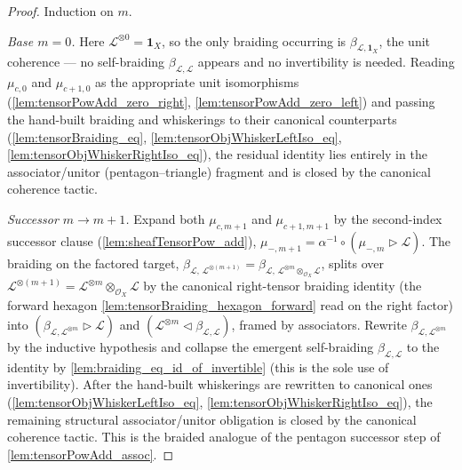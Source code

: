 \begin{proof}
    \leanok
  Induction on \(m\).

  \emph{Base \(m = 0\).} Here \(\mathcal{L}^{\otimes 0} = \mathbf{1}_X\), so the
  only braiding occurring is \(\beta_{\mathcal{L},\mathbf{1}_X}\), the unit
  coherence --- no self-braiding \(\beta_{\mathcal{L},\mathcal{L}}\) appears and
  no invertibility is needed. Reading \(\mu_{c,0}\) and \(\mu_{c+1,0}\) as the
  appropriate unit isomorphisms (\cref{lem:tensorPowAdd_zero_right},
  \cref{lem:tensorPowAdd_zero_left}) and passing the hand-built braiding and
  whiskerings to their canonical counterparts (\cref{lem:tensorBraiding_eq},
  \cref{lem:tensorObjWhiskerLeftIso_eq}, \cref{lem:tensorObjWhiskerRightIso_eq}),
  the residual identity lies entirely in the associator/unitor
  (pentagon--triangle) fragment and is closed by the canonical coherence tactic.

  \emph{Successor \(m \to m+1\).} Expand both \(\mu_{c,m+1}\) and
  \(\mu_{c+1,m+1}\) by the second-index successor clause
  (\cref{lem:sheafTensorPow_add}), \(\mu_{-,m+1} = \alpha^{-1}\circ(\mu_{-,m}
  \rhd\mathcal{L})\). The braiding on the factored target,
  \(\beta_{\mathcal{L},\,\mathcal{L}^{\otimes(m+1)}} =
  \beta_{\mathcal{L},\,\mathcal{L}^{\otimes m}\otimes_{\mathcal{O}_X}\mathcal{L}}\),
  splits over \(\mathcal{L}^{\otimes(m+1)} = \mathcal{L}^{\otimes m}
  \otimes_{\mathcal{O}_X}\mathcal{L}\) by the canonical right-tensor braiding
  identity (the forward hexagon \cref{lem:tensorBraiding_hexagon_forward} read on
  the right factor) into \((\beta_{\mathcal{L},\mathcal{L}^{\otimes m}}\rhd
  \mathcal{L})\) and \((\mathcal{L}^{\otimes m}\lhd\beta_{\mathcal{L},\mathcal{L}})\),
  framed by associators. Rewrite \(\beta_{\mathcal{L},\mathcal{L}^{\otimes m}}\) by
  the inductive hypothesis and collapse the emergent self-braiding
  \(\beta_{\mathcal{L},\mathcal{L}}\) to the identity by
  \cref{lem:braiding_eq_id_of_invertible} (this is the sole use of
  invertibility). After the hand-built whiskerings are rewritten to canonical ones
  (\cref{lem:tensorObjWhiskerLeftIso_eq},
  \cref{lem:tensorObjWhiskerRightIso_eq}), the remaining structural
  associator/unitor obligation is closed by the canonical coherence tactic. This
  is the braided analogue of the pentagon successor step of
  \cref{lem:tensorPowAdd_assoc}.
\end{proof}


